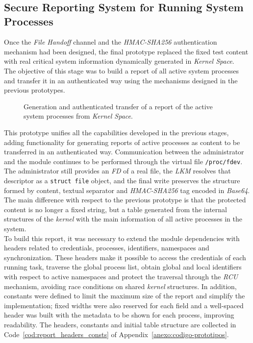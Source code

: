 \

\subsection{Secure Reporting System for Running System Processes}

Once the \textit{File Handoff} channel and the \textit{HMAC-SHA256} authentication mechanism had been designed, the final prototype replaced the fixed test content with real critical system information dynamically generated in \textit{Kernel Space}.\\

The objective of this stage was to build a report of all active system processes and transfer it in an authenticated way using the mechanisms designed in the previous prototypes.

\newpage

\begin{figure}[h!]
  \centering
  \scalebox{0.95}{}
  \caption{Generation and authenticated transfer of a report of the active system processes from \textit{Kernel Space}.}
  \label{fig:final_report_scheme}
\end{figure}

This prototype unifies all the capabilities developed in the previous stages, adding functionality for generating reports of active processes as content to be transferred in an authenticated way.
Communication between the administrator and the module continues to be performed through the virtual file \texttt{/proc/fdev}. The administrator still provides an \textit{FD} of a real file, the \textit{LKM} resolves that descriptor as a \texttt{struct file} object, and the final write preserves the structure formed by content, textual separator and \textit{HMAC-SHA256} tag encoded in \textit{Base64}.
The main difference with respect to the previous prototype is that the protected content is no longer a fixed string, but a table generated from the internal structures of the \textit{kernel} with the main information of all active processes in the system.\\

To build this report, it was necessary to extend the module dependencies with headers related to credentials, processes, identifiers, namespaces and synchronization.
These headers make it possible to access the credentials of each running task, traverse the global process list, obtain global and local identifiers with respect to active namespaces and protect the traversal through the \textit{RCU} mechanism, avoiding race conditions on shared \textit{kernel} structures.
In addition, constants were defined to limit the maximum size of the report and simplify the implementation; fixed widths were also reserved for each field and a well-spaced header was built with the metadata to be shown for each process, improving readability.
The headers, constants and initial table structure are collected in Code~\ref{cod:report_headers_consts} of Appendix~\ref{anexo:codigo-prototipos}.\\


